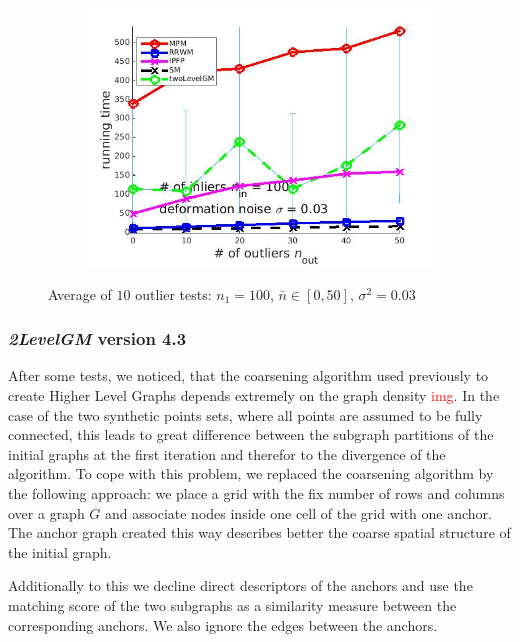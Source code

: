 \documentclass[
	fontsize=12pt,
	paper=a4,
	twoside=false,
	numbers=noenddot,
	plainheadsepline,
	toc=listof,
	toc=bibliography
]{scrartcl}
\newcommand\ToDo[1]{\textcolor{red}{#1}}
\begin{document}
\begin{figure}[h]
\begin{subfigure}[b]{0.3\textwidth}
		\includegraphics[scale=0.25]{"fig_ver2608/syntheticPointSets/ver4.2.1/outliertest_n50/time_avg10t"} 
	\end{subfigure} 	
	\caption{Average of $10$ outlier tests: $n_1=100$, $\bar{n}\in[0,50]$, $\sigma^2=0.03$}
	\label{fig:test3_ver421}
\end{figure}

\FloatBarrier

\subsubsection{\emph{2LevelGM} version 4.3}

After some tests, we noticed, that the coarsening algorithm used previously to create Higher Level Graphs depends extremely on the graph density \ToDo{img}. In the case of the two synthetic points sets, where all points are assumed to be fully connected, this leads to great difference between the subgraph partitions of the initial graphs at the first iteration and therefor to the divergence of the algorithm. 
To cope with this problem, we replaced the coarsening algorithm by the following approach: we place a grid with the fix number of rows and columns over a graph $G$ and associate nodes inside one cell of the grid with one anchor. The anchor graph created this way describes better the coarse spatial structure of the initial graph.

Additionally to this we decline direct descriptors of the anchors and use the matching score of the two subgraphs as a similarity measure between the corresponding anchors. We also ignore the edges between the anchors. 
\end{document}

